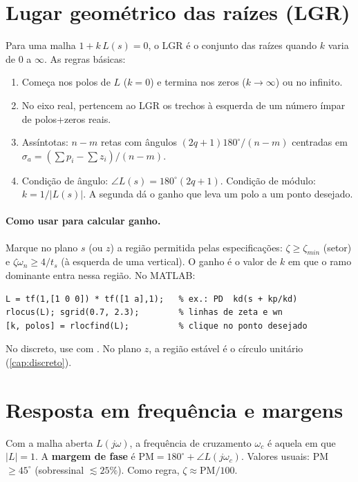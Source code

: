 \section{Lugar geométrico das raízes (LGR)}
Para uma malha $1 + k\,L(s) = 0$, o LGR é o conjunto das raízes quando $k$ varia de 0
a $\infty$. As regras básicas:
\begin{enumerate}
  \item Começa nos polos de $L$ ($k=0$) e termina nos zeros ($k\to\infty$) ou no infinito.
  \item No eixo real, pertencem ao LGR os trechos à esquerda de um número ímpar de
        polos+zeros reais.
  \item Assíntotas: $n-m$ retas com ângulos $(2q+1)180^\circ/(n-m)$ centradas em
        $\sigma_a = (\sum p_i - \sum z_i)/(n-m)$.
  \item Condição de ângulo: $\angle L(s) = 180^\circ(2q+1)$. Condição de módulo:
        $k = 1/|L(s)|$. A segunda dá o ganho que leva um polo a um ponto desejado.
\end{enumerate}

\paragraph{Como usar para calcular ganho.} Marque no plano $s$ (ou $z$) a região
permitida pelas especificações: $\zeta\ge\zeta_{min}$ (setor) e
$\zeta\omega_n\ge 4/t_s$ (à esquerda de uma vertical). O ganho é o valor de $k$ em que o
ramo dominante entra nessa região. No MATLAB:
\begin{lstlisting}
L = tf(1,[1 0 0]) * tf([1 a],1);   % ex.: PD  kd(s + kp/kd)
rlocus(L); sgrid(0.7, 2.3);        % linhas de zeta e wn
[k, polos] = rlocfind(L);          % clique no ponto desejado
\end{lstlisting}
No discreto, use  com . No plano $z$, a região estável é o
círculo unitário (\cref{cap:discreto}).

\section{Resposta em frequência e margens}
Com a malha aberta $L(j\omega)$, a frequência de cruzamento $\omega_c$ é aquela em que
$|L|=1$. A \textbf{margem de fase} é $\text{PM} = 180^\circ + \angle L(j\omega_c)$.
Valores usuais: PM $\ge 45^\circ$ (sobressinal $\lesssim 25\%$). Como regra,
$\zeta\approx \text{PM}/100$.

